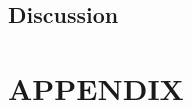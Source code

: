 \documentclass[a4paper, 10pt]{IEEEconf}
\begin{document}
\subsection{Discussion}

%


\nocite{*}




\clearpage
\onecolumn

\section*{APPENDIX}

\begin{lstlisting}[language = C++]

\end{lstlisting}
\end{document}
